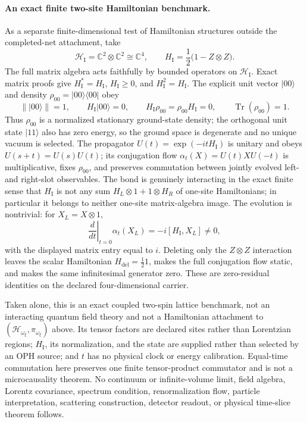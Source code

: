 \documentclass[11pt]{article}
\theoremstyle{remark}
\theoremstyle{plain}
\begin{document}
\paragraph{An exact finite two-site Hamiltonian benchmark.}
As a separate finite-dimensional test of Hamiltonian structures outside the
completed-net attachment, take
\[
  \mathcal H_{\mathrm I}
    = \mathbb C^2\otimes\mathbb C^2 \cong \mathbb C^4,
  \qquad
  H_{\mathrm I}=\frac12\bigl(1-Z\otimes Z\bigr).
\]
The full matrix algebra acts faithfully by bounded operators on
\(\mathcal H_{\mathrm I}\).  Exact matrix proofs give
\(H_{\mathrm I}^{*}=H_{\mathrm I}\), \(H_{\mathrm I}\geq0\), and
\(H_{\mathrm I}^{2}=H_{\mathrm I}\).  The explicit unit vector
\(\lvert00\rangle\) and density
\(\rho_{00}=\lvert00\rangle\langle00\rvert\) obey
\[
  \|\lvert00\rangle\|=1,\qquad
  H_{\mathrm I}\lvert00\rangle=0,\qquad
  H_{\mathrm I}\rho_{00}=\rho_{00}H_{\mathrm I}=0,
  \qquad \operatorname{Tr}(\rho_{00})=1.
\]
Thus \(\rho_{00}\) is a normalized stationary ground-state density; the
orthogonal unit state \(\lvert11\rangle\) also has zero energy, so the ground space is degenerate and no unique vacuum is selected.  The
propagator \(U(t)=\exp(-itH_{\mathrm I})\) is unitary and obeys
\(U(s+t)=U(s)U(t)\); its conjugation flow
\(\alpha_t(X)=U(t)XU(-t)\) is multiplicative, fixes \(\rho_{00}\), and
preserves commutation between jointly evolved left- and right-slot
observables.  The bond is genuinely interacting in the exact finite sense
that \(H_{\mathrm I}\) is not any sum \(H_L\otimes1+1\otimes H_R\) of
one-site Hamiltonians; in particular it belongs to neither one-site
matrix-algebra image.  The
evolution is nontrivial: for \(X_L=X\otimes1\),
\[
  \left.\frac{d}{dt}\right|_{t=0}\alpha_t(X_L)
    =-i[H_{\mathrm I},X_L]\ne0,
\]
with the displayed matrix entry equal to \(i\).  Deleting only the
\(Z\otimes Z\) interaction leaves the scalar Hamiltonian
\(H_{\mathrm{del}}=\tfrac12 1\), makes the full conjugation flow static, and
makes the same infinitesimal generator zero.  These are
zero-residual identities on the declared four-dimensional carrier.

Taken alone, this is an exact coupled two-spin lattice benchmark, not an
interacting quantum field theory and not a Hamiltonian attachment to
\((\mathcal H_{\omega_\xi},\pi_{\omega_\xi})\) above.  Its tensor factors are
declared sites rather than Lorentzian regions; \(H_{\mathrm I}\), its
normalization, and the state are supplied rather than selected by an OPH
source; and \(t\) has no physical clock or energy calibration.  Equal-time
commutation here preserves one finite tensor-product commutator and is not a
microcausality theorem.  No continuum or infinite-volume limit, field
algebra, Lorentz covariance, spectrum condition, renormalization flow,
particle interpretation, scattering construction, detector readout, or
physical time-slice theorem follows.
\end{document}
